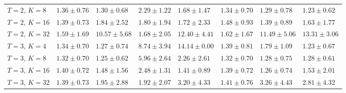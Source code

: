 \documentclass{article}
\begin{document}
\begin{table}[]
{\begin{tabular}{@{}llllllll@{}}
    $T=2$, $K=8$  & $1.36 \pm 0.76$  & $1.30 \pm 0.68$  & $2.29 \pm 1.22$  & $1.68 \pm 1.47$  & $1.34 \pm 0.70$  & $1.29 \pm 0.78$   & $1.23 \pm 0.62$  \\
    $T=2$, $K=16$ & $1.39 \pm 0.73$  & $1.84 \pm 2.52$  & $1.80 \pm 1.94$  & $1.72 \pm 2.33$  & $1.48 \pm 0.93$  & $1.39 \pm 0.89$   & $1.63 \pm 1.77$  \\
    $T=2$, $K=32$ & $1.59 \pm 1.69$  & $10.57 \pm 5.68$ & $1.68 \pm 2.05$  & $12.40 \pm 4.41$ & $1.62 \pm 1.67$  & $11.49 \pm 5.06$  & $13.31 \pm 3.06$ \\
    $T=3$, $K=4$  & $1.34 \pm 0.70$  & $1.27 \pm 0.74$  & $8.74 \pm 3.94$  & $14.14 \pm 0.00$ & $1.39 \pm 0.81$  & $1.79 \pm 1.09$   & $1.23 \pm 0.67$  \\
    $T=3$, $K=8$  & $1.32 \pm 0.70$  & $1.25 \pm 0.62$  & $5.96 \pm 2.64$  & $2.26 \pm 2.61$  & $1.32 \pm 0.70$  & $1.28 \pm 0.75$   & $1.28 \pm 0.61$  \\
    $T=3$, $K=16$ & $1.40 \pm 0.72$  & $1.48 \pm 1.56$  & $2.48 \pm 1.31$  & $1.41 \pm 0.89$  & $1.39 \pm 0.72$  & $1.26 \pm 0.74$   & $1.53 \pm 2.01$  \\
    $T=3$, $K=32$ & $1.39 \pm 0.73$  & $1.95 \pm 2.88$  & $1.92 \pm 2.07$  & $3.20 \pm 4.33$  & $1.41 \pm 0.76$  & $3.26 \pm 4.43$   & $2.81 \pm 4.32$  \\ \bottomrule
    \end{tabular}
}
\end{table}
\end{document}
